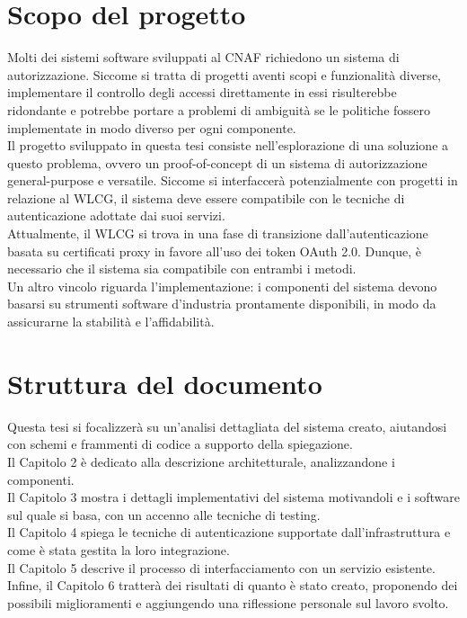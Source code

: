 \section{Scopo del progetto}
Molti dei sistemi software sviluppati al CNAF richiedono un sistema di autorizzazione. Siccome si tratta di progetti aventi scopi e funzionalità diverse,
implementare 
il controllo degli accessi direttamente in essi risulterebbe ridondante e potrebbe portare a problemi di ambiguità 
se le politiche fossero implementate in modo diverso per ogni componente.
\\ Il progetto sviluppato in questa tesi consiste nell'esplorazione di una soluzione a questo problema, ovvero un proof-of-concept di 
un sistema di autorizzazione general-purpose e versatile. Siccome si interfaccerà potenzialmente con progetti in relazione al WLCG, 
il sistema deve essere compatibile
 con le tecniche di autenticazione adottate dai suoi servizi.
\\ Attualmente, il WLCG si trova in una fase di transizione dall'autenticazione basata su certificati proxy in favore all'uso dei token OAuth 2.0.
 Dunque, è necessario che il sistema sia compatibile con entrambi i metodi. 
\\Un altro vincolo riguarda l'implementazione: i componenti del sistema devono basarsi su strumenti software d'industria prontamente disponibili,
 in modo da assicurarne 
la stabilità e l'affidabilità.  

\section{Struttura del documento}
Questa tesi si focalizzerà su un'analisi dettagliata del sistema creato, aiutandosi con schemi e frammenti 
di codice a supporto della spiegazione.
\\ Il Capitolo 2 è dedicato alla descrizione architetturale, analizzandone i componenti. 
\\ Il Capitolo 3 mostra i dettagli implementativi del sistema motivandoli e i software sul quale si basa, con un accenno alle tecniche di testing. 
\\ Il Capitolo 4 spiega le tecniche di autenticazione supportate dall'infrastruttura e come è stata gestita la loro integrazione.  
\\ Il Capitolo 5 descrive il processo di interfacciamento con un servizio esistente. 
\\ Infine, il Capitolo 6 tratterà dei risultati di quanto è stato creato, proponendo 
dei possibili miglioramenti e aggiungendo una riflessione personale sul lavoro svolto. 